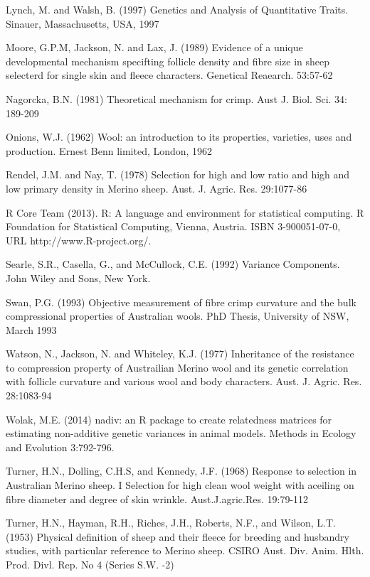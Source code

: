 \documentclass[titlepage]{article}  %
\begin{document}
\begin{thebibliography}{99}
Lynch, M. and Walsh, B. (1997) Genetics and Analysis of Quantitative Traits. Sinauer, Massachusetts, USA, 1997

Moore, G.P.M, Jackson, N. and Lax, J. (1989) Evidence of a unique developmental mechanism specifting follicle density and fibre size in sheep selecterd for single skin and fleece characters. Genetical Reaearch. 53:57-62

Nagorcka, B.N. (1981) Theoretical mechanism for crimp.
     Aust J. Biol. Sci. 34: 189-209

Onions, W.J. (1962) Wool: an introduction to its properties, varieties, uses
     and production. Ernest Benn limited, London, 1962

Rendel, J.M. and Nay, T. (1978) Selection for high and low ratio and high 
    and low primary density in Merino sheep. 
    Aust. J. Agric. Res. 29:1077-86

R Core Team (2013). R: A language and environment for statistical
  computing. R Foundation for Statistical Computing, Vienna, Austria.
  ISBN 3-900051-07-0, URL http://www.R-project.org/.

Searle, S.R., Casella, G., and McCullock, C.E. (1992) Variance Components.
    John Wiley and Sons, New York.


Swan, P.G. (1993) Objective measurement of fibre crimp curvature and the bulk compressional properties of Australian wools. PhD Thesis, University of NSW, March 1993 

Watson, N., Jackson, N. and Whiteley, K.J. (1977) Inheritance of the resistance
    to compression property of Austrailian Merino wool and its genetic 
    correlation with follicle curvature and various wool and body 
    characters. Aust. J. Agric. Res. 28:1083-94

Wolak, M.E. (2014) nadiv: an R package to create relatedness matrices for
    estimating non-additive genetic variances in animal models.
    Methods in Ecology and Evolution 3:792-796.

Turner, H.N., Dolling, C.H.S, and Kennedy, J.F. (1968) Response to selection in Australian Merino sheep. I Selection for high clean wool weight with aceiling on fibre diameter and degree of skin wrinkle. Aust.J.agric.Res. 19:79-112

Turner, H.N., Hayman, R.H., Riches, J.H., Roberts, N.F., and Wilson, L.T. (1953) Physical definition of sheep and their fleece for breeding and husbandry studies, with particular reference to Merino sheep. CSIRO Aust. Div. Anim. Hlth. Prod. Divl. Rep. No 4 (Series S.W. -2)

\end{thebibliography}
\end{document}
